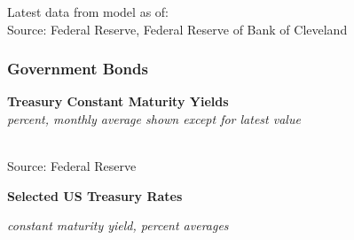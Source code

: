 \documentclass{report}
\makeatletter
\newcommand{\tbllink}[1]{\href{https://raw.githubusercontent.com/bdecon/US-chartbook/master/chartbook/data/#1}{\faTable}}
\newcommand*\short[1]{\expandafter\@gobbletwo\number\numexpr#1\relax}
\newcommand{\absnode}[3]{\node[below right, align=left] at (axis cs: #1,#2) {#3};}
\newcommand{\dateaxisticks}{
		date coordinates in=x, axis line style={draw=none},
		xmax={2023-02-15},
		max space between ticks=40,	    
		xtick={{1990-01-01}, {1992-01-01}, {1994-01-01}, 
			{1996-01-01}, {1998-01-01}, {2000-01-01}, 
			{2002-01-01}, {2004-01-01}, {2006-01-01},
			{2008-01-01}, {2010-01-01}, {2012-01-01}, {2014-01-01},
		    {2016-01-01}, {2018-01-01}, {2020-01-01}, {2022-01-01}, 
		    {2024-01-01}, {2026-01-01}},
		minor xtick={{1989-01-01}, {1991-01-01}, {1993-01-01},
			{1995-01-01}, {1997-01-01}, {1999-01-01}, 
			{2001-01-01}, {2003-01-01}, {2005-01-01}, {2007-01-01},
		    {2009-01-01}, {2011-01-01}, {2013-01-01}, {2015-01-01},
		    {2017-01-01}, {2019-01-01}, {2021-01-01}, {2023-01-01}, 
		    {2025-01-01}, {2027-01-01}},
		enlarge y limits={0.06}, enlarge x limits={0.01},
		}
\newcommand{\bbar}[2]{extra #1 ticks = {{#2}}, extra #1 tick labels = ,
		extra #1 tick style = {grid=major, grid style={thick, black!25}},}
\newcommand{\stdline}[4]{\addplot[very thick, no markers, color=#1] 
		table [x=#2, y=#3, col sep=comma] {#4};	}
\newcommand{\rbars}{
		\fill[color=black!10] (axis cs:{1990-07-01},\pgfkeysvalueof{/pgfplots/ymin}) rectangle 
			(axis cs:{1991-03-01}, \pgfkeysvalueof{/pgfplots/ymax});
		\fill[color=black!10] (axis cs:{2007-12-01},\pgfkeysvalueof{/pgfplots/ymin}) rectangle 
			(axis cs:{2009-07-01}, \pgfkeysvalueof{/pgfplots/ymax});
		\fill[color=black!10] (axis cs:{2001-03-01},\pgfkeysvalueof{/pgfplots/ymin}) rectangle 
			(axis cs:{2001-11-01}, \pgfkeysvalueof{/pgfplots/ymax});
		\fill[color=black!10] (axis cs:{2020-02-01},\pgfkeysvalueof{/pgfplots/ymin}) rectangle 
			(axis cs:{2020-05-01}, \pgfkeysvalueof{/pgfplots/ymax});}
\makeatother
\begin{document}
{\begin{minipage}{0.76\textwidth}
\footnotesize{Latest data from model as of: {}}\\
\footnotesize{Source: Federal Reserve, Federal Reserve of Bank of Cleveland} \hfill \tbllink{inf_exp_ch.csv}
\end{minipage}
\newpage
\begin{minipage}{0.76\textwidth}
\subsubsection*{Government Bonds}
\small  
\vspace{1mm}

\normalsize \textbf{Treasury Constant Maturity Yields}\\
\footnotesize{\textit{percent, monthly average shown except for latest value }}\\
\hspace*{-2mm} \\
\footnotesize{Source: Federal Reserve} \hfill \tbllink{rates.csv}
\vspace{3mm}

\normalsize \textbf{Selected US Treasury Rates}\\
\footnotesize{\textit{constant maturity yield, percent \hspace{18mm}averages}\\
\hspace*{-3mm}  \setlength{\tabcolsep}{2.0pt} \color{black!90}
		{\renewcommand{\arraystretch}{1.55}
\begin{tabular}{p{17mm} R{10.2mm} R{10.2mm} R{10.2mm} R{9.5mm}
		 		 R{9.5mm} R{9.5mm} R{9.5mm} R{9.5mm} R{9.5mm}}
			  \hline
		\end{tabular}}}


\end{minipage}}
\end{document}
